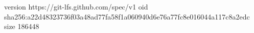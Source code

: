 version https://git-lfs.github.com/spec/v1
oid sha256:a22d48323736f03a48ad77fa58f1a060940d6e76a77fc8e016044a117c8a2edc
size 186448
